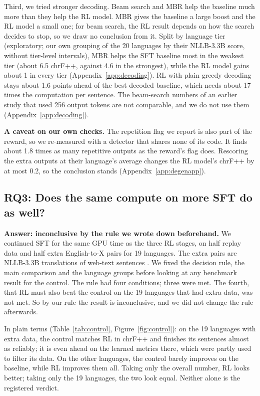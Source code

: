 Third, we tried stronger decoding. Beam search and MBR help the baseline much more than they help the RL model. MBR gives the baseline a large boost and the RL model a small one; for beam search, the RL result depends on how the search decides to stop, so we draw no conclusion from it. Split by language tier (exploratory; our own grouping of the 20 languages by their NLLB-3.3B score, without tier-level intervals), MBR helps the SFT baseline most in the weakest tier (about 6.5 chrF++, against 4.6 in the strongest), while the RL model gains about 1 in every tier (Appendix~\ref{app:decoding}). RL with plain greedy decoding stays about 1.6 points ahead of the best decoded baseline, which needs about 17 times the computation per sentence. The beam-search numbers of an earlier study that used 256 output tokens are not comparable, and we do not use them (Appendix~\ref{app:decoding}).

\textbf{A caveat on our own checks.} The repetition flag we report is also part of the reward, so we re-measured with a detector that shares none of its code. It finds about 1.8 times as many repetitive outputs as the reward's flag does. Rescoring the extra outputs at their language's average changes the RL model's chrF++ by at most 0.2, so the conclusion stands (Appendix~\ref{app:degenapp}).

\subsection{RQ3: Does the same compute on more SFT do as well?}\label{sec:rq3}
\textbf{Answer: inconclusive by the rule we wrote down beforehand.} We continued SFT for the same GPU time as the three RL stages, on half replay data and half extra English-to-X pairs for 19 languages. The extra pairs are NLLB-3.3B translations of web-text sentences \citep{gritta2026translatepsy}. We fixed the decision rule, the main comparison and the language groups before looking at any benchmark result for the control. The rule had four conditions; three were met. The fourth, that RL must also beat the control on the 19 languages that had extra data, was not met. So by our rule the result is inconclusive, and we did not change the rule afterwards.

In plain terms (Table~\ref{tab:control}, Figure~\ref{fig:control}): on the 19 languages with extra data, the control matches RL in chrF++ and finishes its sentences almost as reliably; it is even ahead on the learned metrics there, which were partly used to filter its data. On the other languages, the control barely improves on the baseline, while RL improves them all. Taking only the overall number, RL looks better; taking only the 19 languages, the two look equal. Neither alone is the registered verdict.


